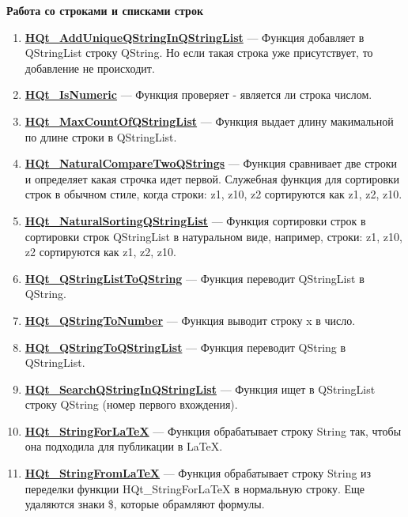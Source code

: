 \documentclass[a4paper,12pt]{article}
\begin{document}
\textbf{Работа со строками и списками строк}
\begin{enumerate}

\item \textbf{\hyperref[HQt_AddUniqueQStringInQStringList]{HQt\_AddUniqueQStringInQStringList}} --- Функция добавляет в QStringList строку QString. Но если такая строка уже присутствует, то добавление не происходит.

\item \textbf{\hyperref[HQt_IsNumeric]{HQt\_IsNumeric}} --- Функция проверяет - является ли строка числом.

\item \textbf{\hyperref[HQt_MaxCountOfQStringList]{HQt\_MaxCountOfQStringList}} --- Функция выдает длину макимальной по длине строки в QStringList.

\item \textbf{\hyperref[HQt_NaturalCompareTwoQStrings]{HQt\_NaturalCompareTwoQStrings}} --- Функция сравнивает две строки и определяет какая строчка идет первой. Служебная функция для сортировки строк в обычном стиле, когда строки: z1, z10, z2 сортируются как z1, z2, z10.

\item \textbf{\hyperref[HQt_NaturalSortingQStringList]{HQt\_NaturalSortingQStringList}} --- Функция сортировки строк в сортировки строк QStringList в натуральном виде, например, строки: z1, z10, z2 сортируются как z1, z2, z10.

\item \textbf{\hyperref[HQt_QStringListToQString]{HQt\_QStringListToQString}} --- Функция переводит QStringList в QString.

\item \textbf{\hyperref[HQt_QStringToNumber]{HQt\_QStringToNumber}} --- Функция выводит строку x в число.

\item \textbf{\hyperref[HQt_QStringToQStringList]{HQt\_QStringToQStringList}} --- Функция переводит QString в QStringList.

\item \textbf{\hyperref[HQt_SearchQStringInQStringList]{HQt\_SearchQStringInQStringList}} --- Функция ищет в QStringList строку QString (номер первого вхождения).

\item \textbf{\hyperref[HQt_StringForLaTeX]{HQt\_StringForLaTeX}} --- Функция обрабатывает строку String так, чтобы она подходила для публикации в LaTeX.

\item \textbf{\hyperref[HQt_StringFromLaTeX]{HQt\_StringFromLaTeX}} --- Функция обрабатывает строку String из переделки функции HQt\_StringForLaTeX в нормальную строку. Еще удаляются знаки \$, которые обрамляют формулы.


\end{enumerate}
\end{document}

